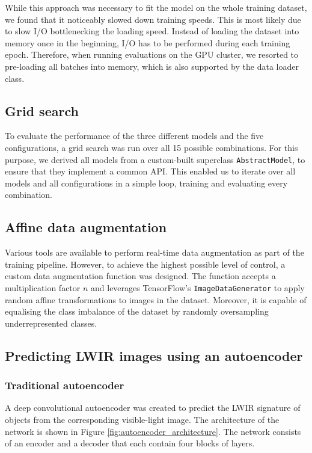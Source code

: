 \documentclass{l4proj}
\begin{document}
While this approach was necessary to fit the model on the whole training dataset, we found that it noticeably slowed down training speeds. This is most likely due to slow I/O bottlenecking the loading speed. Instead of loading the dataset into memory once in the beginning, I/O has to be performed during each training epoch. Therefore, when running evaluations on the GPU cluster, we resorted to pre-loading all batches into memory, which is also supported by the data loader class.

\subsection{Grid search}
\label{gridsearch_impl}

To evaluate the performance of the three different models and the five configurations, a grid search was run over all 15 possible combinations. For this purpose, we derived all models from a custom-built superclass \lstinline{AbstractModel}, to ensure that they implement a common API. This enabled us to iterate over all models and all configurations in a simple loop, training and evaluating every combination.

\subsection{Affine data augmentation}
\label{augmentation_impl}

Various tools are available to perform real-time data augmentation as part of the training pipeline. However, to achieve the highest possible level of control, a custom data augmentation function was designed. The function accepts a multiplication factor $n$ and leverages TensorFlow's \lstinline{ImageDataGenerator} to apply random affine transformations to images in the dataset. Moreover, it is capable of equalising the class imbalance of the dataset by randomly oversampling underrepresented classes.


\subsection{Predicting LWIR images using an autoencoder}
\label{autoencoder_implementation}

\subsubsection{Traditional autoencoder}

A deep convolutional autoencoder was created to predict the LWIR signature of objects from the corresponding visible-light image. The architecture of the network is shown in Figure \ref{fig:autoencoder_architecture}. The network consists of an encoder and a decoder that each contain four blocks of layers.
\end{document}
